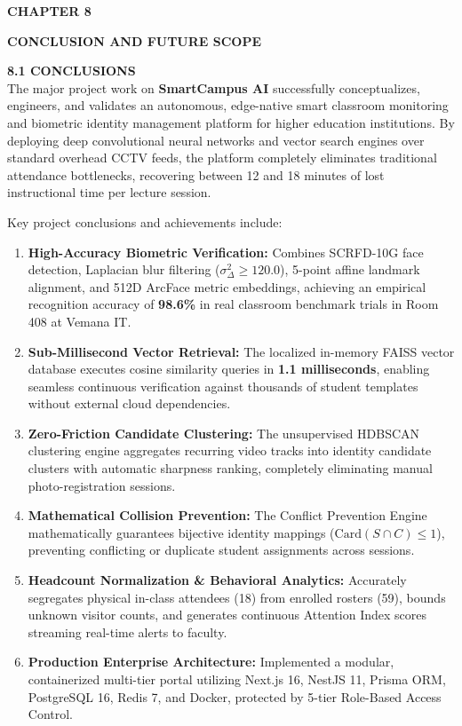 \newpage
\begin{flushleft}
{\fontsize{16pt}{16pt}\selectfont \textbf{CHAPTER 8}}
\end{flushleft}		
\begin{center}
{\fontsize{18pt}{22pt}\selectfont \textbf{CONCLUSION AND FUTURE SCOPE}}\\[2mm]
\end{center}

\onehalfspacing
\justifying
\noindent \textbf{8.1 CONCLUSIONS} \\[2mm]
The major project work on \textbf{SmartCampus AI} successfully conceptualizes, engineers, and validates an autonomous, edge-native smart classroom monitoring and biometric identity management platform for higher education institutions. By deploying deep convolutional neural networks and vector search engines over standard overhead CCTV feeds, the platform completely eliminates traditional attendance bottlenecks, recovering between 12 and 18 minutes of lost instructional time per lecture session.

\vspace{0.15in}
\noindent Key project conclusions and achievements include:
\begin{enumerate}
    \item \textbf{High-Accuracy Biometric Verification:} Combines SCRFD-10G face detection, Laplacian blur filtering ($\sigma^2_\Delta \ge 120.0$), 5-point affine landmark alignment, and 512D ArcFace metric embeddings, achieving an empirical recognition accuracy of \textbf{98.6\%} in real classroom benchmark trials in Room 408 at Vemana IT.
    \item \textbf{Sub-Millisecond Vector Retrieval:} The localized in-memory FAISS vector database executes cosine similarity queries in \textbf{1.1 milliseconds}, enabling seamless continuous verification against thousands of student templates without external cloud dependencies.
    \item \textbf{Zero-Friction Candidate Clustering:} The unsupervised HDBSCAN clustering engine aggregates recurring video tracks into identity candidate clusters with automatic sharpness ranking, completely eliminating manual photo-registration sessions.
    \item \textbf{Mathematical Collision Prevention:} The Conflict Prevention Engine mathematically guarantees bijective identity mappings ($\text{Card}(S \cap C) \le 1$), preventing conflicting or duplicate student assignments across sessions.
    \item \textbf{Headcount Normalization \& Behavioral Analytics:} Accurately segregates physical in-class attendees (18) from enrolled rosters (59), bounds unknown visitor counts, and generates continuous Attention Index scores streaming real-time alerts to faculty.
    \item \textbf{Production Enterprise Architecture:} Implemented a modular, containerized multi-tier portal utilizing Next.js 16, NestJS 11, Prisma ORM, PostgreSQL 16, Redis 7, and Docker, protected by 5-tier Role-Based Access Control.
\end{enumerate}

